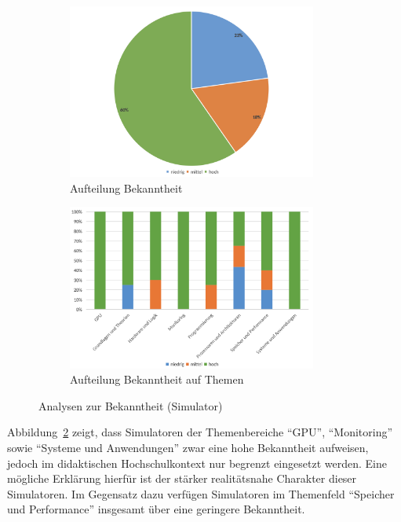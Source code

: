 \begin{figure}[!htbp]
    \centering
    \begin{subfigure}[b]{0.48\textwidth}
        \centering
        \includegraphics[width=0.90\textwidth]{paper/graphics_sim/15-bekanntheit2.png}
        \caption{Aufteilung Bekanntheit}
        \label{fig:15-bekanntheit}
    \end{subfigure}
    \hfill
    \begin{subfigure}[b]{0.48\textwidth}
        \centering
        \includegraphics[width=0.90\textwidth]{graphics_sim/16-bekanntheit-thema.png}
        \caption{Aufteilung Bekanntheit auf Themen}
        \label{fig:16-bekanntheit-thema}
    \end{subfigure}
    \caption{Analysen zur Bekanntheit (Simulator)}
    \label{fig:bekanntheit-gesamt}
\end{figure}

Abbildung~\ref{fig:16-bekanntheit-thema} zeigt, dass Simulatoren der Themenbereiche \enquote{GPU}, \enquote{Monitoring} sowie \enquote{Systeme und Anwendungen} zwar eine hohe Bekanntheit aufweisen, jedoch im didaktischen Hochschulkontext nur begrenzt eingesetzt werden. Eine mögliche Erklärung hierfür ist der stärker realitätsnahe Charakter dieser Simulatoren. Im Gegensatz dazu verfügen Simulatoren im Themenfeld \enquote{Speicher und Performance} insgesamt über eine geringere Bekanntheit.
